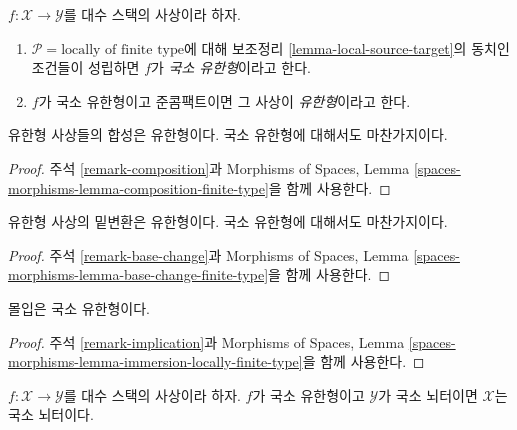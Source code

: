 \begin{definition}
\label{definition-locally-finite-type}
$f : \mathcal{X} \to \mathcal{Y}$를 대수 스택의 사상이라 하자.
\begin{enumerate}
\item $\mathcal{P} = \text{locally of finite type}$에 대해 보조정리
\ref{lemma-local-source-target}의 동치인 조건들이 성립하면 $f$가
{\it 국소 유한형}이라고 한다.
\item $f$가 국소 유한형이고 준콤팩트이면 그 사상이 {\it 유한형}이라고 한다.
\end{enumerate}
\end{definition}

\begin{lemma}
\label{lemma-composition-finite-type}
유한형 사상들의 합성은 유한형이다. 국소 유한형에 대해서도 마찬가지이다.
\end{lemma}

\begin{proof}
주석 \ref{remark-composition}과 Morphisms of Spaces, Lemma
\ref{spaces-morphisms-lemma-composition-finite-type}을 함께 사용한다.
\end{proof}

\begin{lemma}
\label{lemma-base-change-finite-type}
유한형 사상의 밑변환은 유한형이다. 국소 유한형에 대해서도 마찬가지이다.
\end{lemma}

\begin{proof}
주석 \ref{remark-base-change}과 Morphisms of Spaces, Lemma
\ref{spaces-morphisms-lemma-base-change-finite-type}을 함께 사용한다.
\end{proof}

\begin{lemma}
\label{lemma-immersion-locally-finite-type}
몰입은 국소 유한형이다.
\end{lemma}

\begin{proof}
주석 \ref{remark-implication}과 Morphisms of Spaces, Lemma
\ref{spaces-morphisms-lemma-immersion-locally-finite-type}을 함께 사용한다.
\end{proof}

\begin{lemma}
\label{lemma-locally-finite-type-locally-noetherian}
$f : \mathcal{X} \to \mathcal{Y}$를 대수 스택의 사상이라 하자.
$f$가 국소 유한형이고 $\mathcal{Y}$가 국소 뇌터이면
$\mathcal{X}$는 국소 뇌터이다.
\end{lemma}


